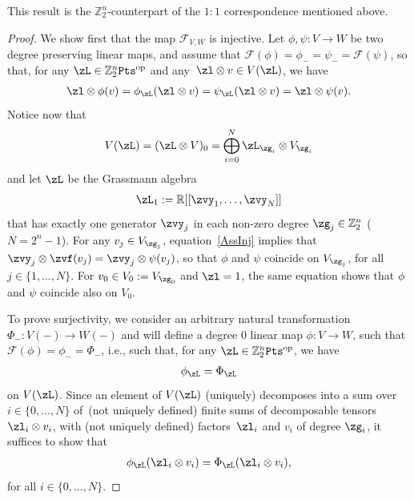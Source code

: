 \documentclass[10pt,a4paper]{amsart}
\newcommand{\op}[1]{\operatorname{#1}}
\newcommand{\R}{{\mathbb R}}
\newcommand{\Z}{{\mathbb Z}}
\def\cF{\mathcal{F}}
\newcommand{\0}{\otimes}
\numberwithin{equation}{section}
\begin{document}
This result is the $\Z_2^n$-counterpart of the $1:1$ correspondence mentioned above.

\begin{proof}
We show first that the map $\cF_{ V, W}$ is injective. Let $\phi,\psi\colon V\to W$ be two degree preserving linear maps, and assume that $\cF(\phi)=\phi_-=\psi_-=\cF(\psi)$, so that, for any $\zL\in\Z_2^n{\tt Pts}^{\op{op}}$ and any~$\zl\0 v\in V(\zL)$, we have
\begin{gather}\label{AssInj}
\zl\0 \phi(v)=\phi_\zL(\zl\0 v)=\psi_\zL(\zl\0 v)=\zl\0 \psi(v).
\end{gather}
Notice now that
\[
V(\zL)=(\zL\0 V)_0=\bigoplus_{i=0}^N\zL_{\zg_i}\0 V_{\zg_i}
\]
and let $\zL$ be the Grassmann algebra
\begin{gather}\label{Lambda1}
\zL_1:=\R[[\zvy_1,\dots,\zvy_N]]
\end{gather}
that has exactly one generator $\zvy_j$ in each non-zero degree $\zg_j\in\Z_2^n$ ($N=2^n-1$). For any $v_j\in V_{\zg_j}$, equation~\eqref{AssInj} implies that $\zvy_j \otimes \zvf(v_j)=\zvy_j \otimes\psi(v_j)$, so that $\phi$ and $\psi$ coincide on $ V_{\zg_j}$, for all $j\in\{1,\dots,N\}$. For $v_0\in V_0:= V_{\zg_0}$ and $\zl=1$, the same equation shows that $\phi$ and $\psi$ coincide also on $ V_0$.

To prove surjectivity, we consider an arbitrary natural transformation $\Phi_-\colon V(-)\to W(-)$ and will define a degree 0 linear map $\phi\colon V\to W$, such that $\cF(\phi)=\phi_- =\Phi_-$, i.e., such that, for any $\zL\in\Z_2^n{\tt Pts}^{\op{op}}$, we have
\begin{gather*}%
\phi_\zL=\Phi_\zL
\end{gather*}
on $ V(\zL)$.
Since an element of $ V(\zL)$ (uniquely) decomposes into a sum over $i\in\{0,\dots, N\}$ of~(not uniquely defined) finite sums of decomposable tensors $\zl_i\0 v_i$, with (not uniquely defined) factors~$\zl_i$ and $v_i$ of degree $\zg_i$, it suffices to show that
\begin{gather}\label{CondSurj2}
\phi_\zL(\zl_i\0 v_i)=\Phi_\zL(\zl_i\0 v_i),
\end{gather}
for all $i\in\{0,\dots,N\}$.


\end{proof}
\end{document}
